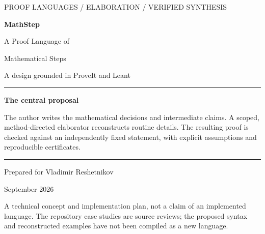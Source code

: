 \documentclass[11pt,a4paper]{article}
\theoremstyle{remark}
\begin{document}
\hypersetup{pageanchor=false}
\begin{titlepage}
\color{ink}
\vspace*{13mm}
{\sffamily\small\color{accent} PROOF LANGUAGES / ELABORATION / VERIFIED SYNTHESIS\par}
\vspace{12mm}
{\sffamily\fontsize{33}{39}\selectfont\bfseries MathStep\par}
\vspace{4mm}
{\sffamily\fontsize{23}{29}\selectfont A Proof Language of\par Mathematical Steps\par}
\vspace{9mm}
{\Large A design grounded in ProveIt and Leant\par}
\vspace{12mm}
\par\noindent\rule{\linewidth}{0.5pt}\par
\vspace{4mm}
{\large\textbf{The central proposal}\par}
The author writes the mathematical decisions and intermediate claims. A scoped, method-directed elaborator reconstructs routine details. The resulting proof is checked against an independently fixed statement, with explicit assumptions and reproducible certificates.
\vspace{5mm}
\par\noindent\rule{\linewidth}{0.5pt}\par
\vfill
{\sffamily Prepared for Vladimir Reshetnikov\par}
{ September 2026\par}
\vspace{5mm}
{\small A technical concept and implementation plan, not a claim of an implemented language. The repository case studies are source reviews; the proposed syntax and reconstructed examples have not been compiled as a new language.}
\end{titlepage}
\hypersetup{pageanchor=true}
\end{document}
